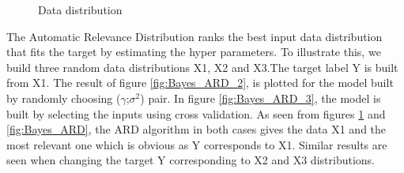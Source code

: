 \begin{figure}[!ht]
\begin{floatrow}
{			\caption{Data distribution}\label{fig:Bayes_ARD_1}%
		}
	\end{floatrow}
\end{figure}
The Automatic Relevance Distribution ranks the best input data distribution that fits the target by estimating the hyper parameters. To illustrate this, we build three random data distributions X1, X2 and X3.The target label Y is built from X1. The result of figure \ref{fig:Bayes_ARD_2}, is plotted for the model built by randomly choosing ($\gamma$;$\sigma^2$) pair. In figure \ref{fig:Bayes_ARD_3}, the model is built by selecting the inputs using cross validation. As seen from figures \ref{fig:Bayes_ARD_1} and \ref{fig:Bayes_ARD}, the ARD algorithm in both cases gives the data X1 and the most relevant one which is obvious as Y corresponds to X1. Similar results are seen when changing the target Y corresponding to X2 and X3 distributions.   
